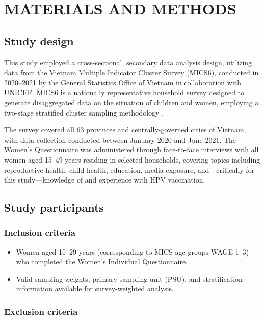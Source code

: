 \chapter{MATERIALS AND METHODS}

\section{Study design}

This study employed a cross-sectional, secondary data analysis design, utilizing data from the Vietnam Multiple Indicator Cluster Survey (MICS6), conducted in 2020--2021 by the General Statistics Office of Vietnam in collaboration with UNICEF. MICS6 is a nationally representative household survey designed to generate disaggregated data on the situation of children and women, employing a two-stage stratified cluster sampling methodology \cite{unicef2022}.

The survey covered all 63 provinces and centrally-governed cities of Vietnam, with data collection conducted between January 2020 and June 2021. The Women's Questionnaire was administered through face-to-face interviews with all women aged 15--49 years residing in selected households, covering topics including reproductive health, child health, education, media exposure, and---critically for this study---knowledge of and experience with HPV vaccination.

\section{Study participants}

\subsection{Inclusion criteria}

\begin{itemize}
	\item Women aged 15--29 years (corresponding to MICS age groups WAGE 1--3) who completed the Women's Individual Questionnaire.
	\item Valid sampling weights, primary sampling unit (PSU), and stratification information available for survey-weighted analysis.
\end{itemize}

\subsection{Exclusion criteria}

